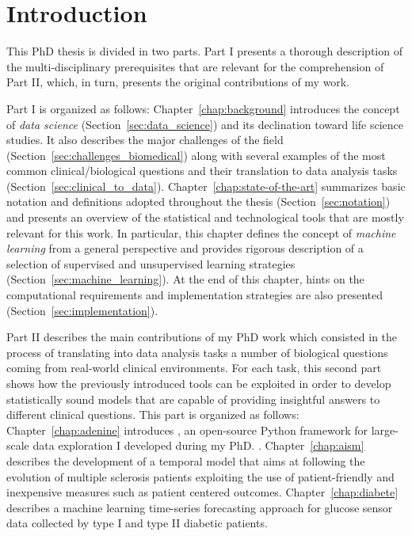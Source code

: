 
\chapter{Introduction} \label{chapter:introduction}




This PhD thesis is divided in two parts. Part I presents a thorough description of the multi-disciplinary prerequisites that are relevant for the comprehension of Part II, which, in turn, presents the original contributions of my work.

Part I is organized as follows: Chapter~\ref{chap:background} introduces the concept of \textit{data science} (Section~\ref{sec:data_science}) and its declination toward life science studies. It also describes the major challenges of the field (Section~\ref{sec:challenges_biomedical}) along with several examples of the most common clinical/biological questions and their translation to data analysis tasks (Section~\ref{sec:clinical_to_data}).
Chapter~\ref{chap:state-of-the-art} summarizes basic notation and definitions adopted throughout the thesis (Section~\ref{sec:notation}) and presents an overview of the statistical and technological tools that are mostly relevant for this work. In particular, this chapter defines the concept of \textit{machine learning} from a general perspective and provides rigorous description of a selection of supervised and unsupervised learning strategies (Section~\ref{sec:machine_learning}). At the end of this chapter, hints on the computational requirements and implementation strategies are also presented (Section~\ref{sec:implementation}).

Part II describes the main contributions of my PhD work which consisted in the process of translating into data analysis tasks a number of biological questions coming from real-world clinical environments. For each task, this second part shows how the previously introduced tools can be exploited in order to develop statistically sound models that are capable of providing insightful answers to different clinical questions.
This part is organized as follows:
Chapter~\ref{chap:adenine} introduces \ade, an open-source Python framework for large-scale data exploration I developed during my PhD. .
Chapter~\ref{chap:aism} describes the development of a temporal model that aims at following the evolution of multiple sclerosis patients exploiting the use of patient-friendly and inexpensive measures such as patient centered outcomes.
Chapter~\ref{chap:diabete} describes a machine learning time-series forecasting approach for glucose sensor data collected by type I and type II diabetic patients.